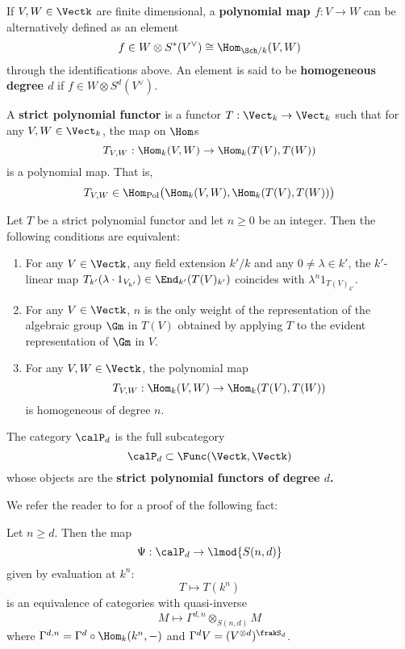 \documentclass[12pt]{article}
\begin{document}
	\begin{defn}
		If $V,W\in\Vectk$ are finite dimensional, a \textbf{polynomial map $f:V\to W$} can be alternatively defined as an element 
		\[f\in W\otimes S^\ast(V^\vee)\cong\Hom_{\Sch/k}(V,W)\]
		through the identifications above. An element is said to be \textbf{homogeneous degree $d$} 
		if $f\in W\otimes S^d(V^\vee)$.
	\end{defn}
	\begin{defn}
		A \textbf{strict polynomial functor} is a functor $T:\Vect_k\to \Vect_k$ such that for any $V,W\in\Vect_k$,
		the map on $\Hom$s
		\[T_{V,W}:\Hom_k(V,W)\to \Hom_k(T(V),T(W))\]
		is a polynomial map. That is,
		\[T_{V,W}\in\Hom_\text{Pol}\big(\Hom_k(V,W), \Hom_k(T(V),T(W))\big)\]
	\end{defn}
	\begin{lem}
		Let $T$ be a strict polynomial functor and let $n\ge 0$ be an integer. Then the following conditions are equivalent:
		\begin{enumerate}
			\item For any $V\in\Vectk$, any field extension $k'/k$ and any $0\ne\lambda\in k'$, the $k'$-linear 
			map $T_{k'}(\lambda\cdot 1_{V_{k'}})\in\End_{k'}(T(V)_{k'})$ coincides with $\lambda^n1_{T(V)_{k'}}$.
			\item For any $V\in\Vectk$, $n$ is the only weight of the representation of the algebraic group $\Gm$ in $T(V)$
			obtained by applying $T$ to the evident representation of $\Gm$ in $V$.
			\item For any $V,W\in\Vectk$, the polynomial map 
			\[T_{V,W}:\Hom_k(V,W)\to \Hom_k(T(V),T(W))\] 
			is homogeneous of degree $n$.
		\end{enumerate}
	\end{lem}
	\begin{defn}
		The category $\calP_d$ is the full subcategory 
		\[\calP_d\subset\Func(\Vectk,\Vectk)\]
		whose objects are the \textbf{strict polynomial functors of degree $d$.}
	\end{defn}
	
	We refer the reader to \cite[Thm. 3.2]{friedlander-suslin} for a proof of the following fact:
	\begin{thm}\label{thm:FS-equiv}
		Let $n\ge d$. Then the map
		\[\Psi:\calP_d\to \lmod {S(n,d)}\]
		given by evaluation at $k^n$:
		\[T\mapsto T(k^n)\]
		is an equivalence of categories with quasi-inverse 
		\[M\mapsto\Gamma^{d,n}\otimes_{S(n,d)}M\]
		where $\Gamma^{d,n}=\Gamma^d\circ\Hom_k(k^n,-)$ and $\Gamma^dV=(V^{\otimes d})^{\frakS_d}$.
	\end{thm}
	
\end{document}

